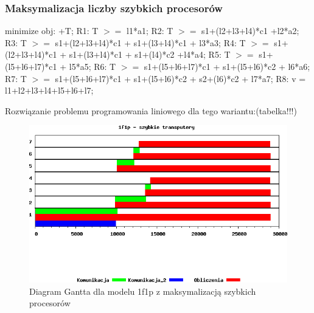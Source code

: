 \documentclass[a4paper,11pt, titlepage]{article}
\begin{document}
\subsubsection{Maksymalizacja liczby szybkich procesorów}
\begin{flushleft}
minimize obj: +T;\linebreak
\linebreak
R1: T $>=$ l1*a1;\linebreak
R2: T $>=$ s1+(l2+l3+l4)*c1 +l2*a2;\linebreak
R3: T $>=$ s1+(l2+l3+l4)*c1 + s1+(l3+l4)*c1 + l3*a3;\linebreak
R4: T $>=$ s1+(l2+l3+l4)*c1 + s1+(l3+l4)*c1 + s1+(l4)*c2 +l4*a4;\linebreak
R5: T $>=$ s1+(l5+l6+l7)*c1 + l5*a5;\linebreak
R6: T $>=$ s1+(l5+l6+l7)*c1 + s1+(l5+l6)*c2 + l6*a6;\linebreak
R7: T $>=$ s1+(l5+l6+l7)*c1 + s1+(l5+l6)*c2 +  s2+(l6)*c2 + l7*a7;\linebreak
R8: v = l1+l2+l3+l4+l5+l6+l7;\linebreak
\end{flushleft}

Rozwiązanie problemu programowania liniowego dla tego wariantu:(tabelka!!!)
\begin{figure}[htp!]
\includegraphics[width=1.0\textwidth]{wykresy/1p1f_proc}
\caption{Diagram Gantta dla modelu 1f1p z maksymalizacją szybkich procesorów \label{1p1f_p}}
\end{figure}
\end{document}
